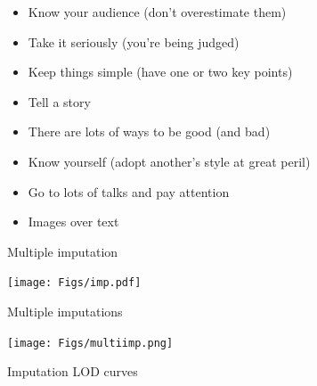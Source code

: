 \documentclass[12pt]{article}
\newcommand{\headsize}{\fontsize{35}{35} \selectfont}
\newcommand{\smallsize}{\fontsize{25}{30} \selectfont}
\newcommand{\smallersize}{\fontsize{20}{25} \selectfont}
\begin{document}
\vspace{30mm} \color{mywhite} \smallsize

\hfill \begin{minipage}{9.5in}

\begin{itemize}
\itemsep18pt
\item Know your audience {\color{myblue} \smallersize (don't {\color{mypink} over}estimate them)}

\item Take it seriously {\color{myblue} \smallersize (you're being judged)}

\item Keep things simple {\color{myblue} \smallersize (have one or two
    key points)}

\item Tell a story

\item There are lots of ways to be good (and {\color{mypink} bad})

\item Know yourself {\color{myblue} \smallersize (adopt another's style at great peril)}

\item Go to lots of talks and {\color{mypink} pay attention}

\item Images over text

\end{itemize}

\end{minipage}


\newpage

\headsize \color{myyellow}
\hfill \begin{minipage}{5.75in}
\centering
Multiple imputation
\end{minipage}

\vfill

\centerline{\texttt{[image: Figs/imp.pdf]}}


\newpage

\headsize \color{myyellow}
\hfill \begin{minipage}{5.75in}
\centering
Multiple imputations
\end{minipage}

\vfill

\centerline{\texttt{[image: Figs/multiimp.png]}}



\newpage

\headsize \color{myyellow}
\hfill \begin{minipage}{5.75in}
\centering
Imputation LOD curves
\end{minipage}
\end{document}
